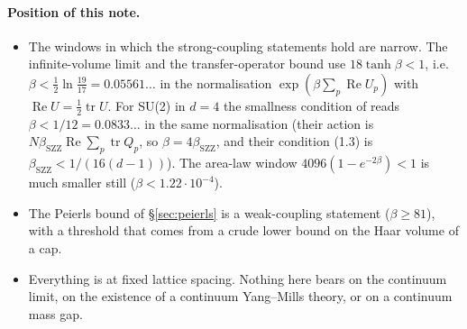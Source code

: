 \documentclass[11pt,a4paper]{article}
\theoremstyle{definition}
\theoremstyle{remark}
\newcommand{\tr}{\operatorname{tr}}
\renewcommand{\Re}{\operatorname{Re}}
\begin{document}
\paragraph{Position of this note.}
\begin{itemize}[leftmargin=1.5em]
\item The windows in which the strong-coupling statements hold are narrow. The infinite-volume limit and the transfer-operator bound use $18\tanh\beta<1$, i.e.\ $\beta<\tfrac12\ln\tfrac{19}{17}=0.05561\ldots$ in the normalisation $\exp(\beta\sum_p\Re U_p)$ with $\Re U=\frac12\tr U$. For SU(2) in $d=4$ the smallness condition of \cite{SZZ} reads $\beta<1/12=0.0833\ldots$ in the same normalisation (their action is $N\beta_{\mathrm{SZZ}}\Re\sum_p\tr Q_p$, so $\beta=4\beta_{\mathrm{SZZ}}$, and their condition (1.3) is $\beta_{\mathrm{SZZ}}<1/(16(d-1))$). The area-law window $4096(1-e^{-2\beta})<1$ is much smaller still ($\beta<1.22\cdot10^{-4}$).
\item The Peierls bound of \S\ref{sec:peierls} is a weak-coupling statement ($\beta\ge 81$), with a threshold that comes from a crude lower bound on the Haar volume of a cap.
\item Everything is at fixed lattice spacing. Nothing here bears on the continuum limit, on the existence of a continuum Yang--Mills theory, or on a continuum mass gap.
\end{itemize}
\end{document}
